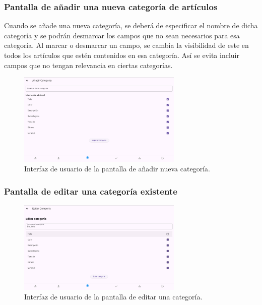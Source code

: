 \subsubsection{Pantalla de añadir una nueva categoría de artículos}

Cuando se añade una nueva categoría, se deberá de especificar el nombre de dicha categoría y se podrán desmarcar los campos que no sean necesarios para esa categoría. Al marcar o desmarcar un campo, se cambia la visibilidad de este en todos los artículos que estén contenidos en esa categoría. Así se evita incluir campos que no tengan relevancia en ciertas categorías. 

\begin{figure}[H]
	\centering
	\includegraphics[width=0.7\textwidth]{imagenes/PrimeraIteracion/nuevaCategoria.png}
	\caption{Interfaz de usuario de la pantalla de añadir nueva categoría.}
	\label{fig:appNuevaCategoria}
\end{figure}

\subsubsection{Pantalla de editar una categoría existente}

\begin{figure}[H]
	\centering
	\includegraphics[width=0.7\textwidth]{imagenes/PrimeraIteracion/editarCategoria.png}
	\caption{Interfaz de usuario de la pantalla de editar una categoría.}
	\label{fig:appEditarCategoria}
\end{figure}


